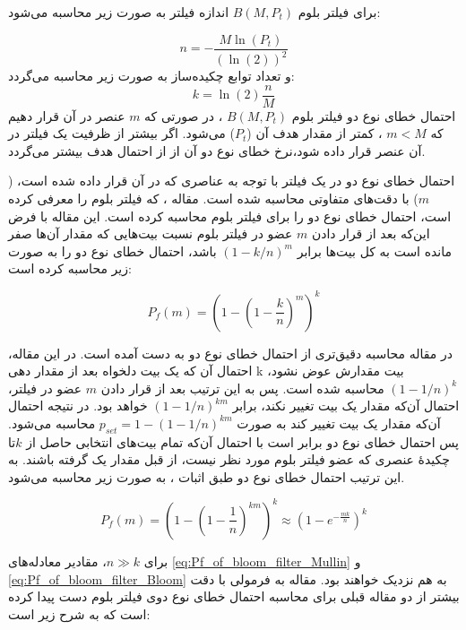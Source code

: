 برای فیلتر بلوم
$B(M, P_t)$
اندازه فیلتر به صورت زیر محاسبه می‌شود\cite{Gervais2014}:

\begin{equation}
n=-\frac{M\ln(P_t)}{\left(\ln(2)\right)^2} \label{eq:n_of_bloom_filter}
\end{equation}
و تعداد توابع چکیده‌ساز به صورت زیر محاسبه می‌گردد\cite{Gervais2014}:
\begin{equation}
k=\ln(2)\frac{n}{M} \label{eq:k_of_bloom_filter}
\end{equation}
احتمال خطای نوع دو فیلتر بلوم
$B(M, P_t)$
، در صورتی که $m$ عنصر در آن قرار دهیم که
$m<M$
، کمتر از مقدار هدف آن ($P_t$) می‌شود. اگر بیشتر از ظرفیت یک فیلتر در آن عنصر قرار داده شود،‌نرخ خطای نوع دو آن از از احتمال هدف بیشتر می‌گردد.

احتمال خطای نوع دو در یک فیلتر با توجه به عناصری که در آن قرار داده شده است، ($m$) با دقت‌های متفاوتی محاسبه شده است. مقاله \cite{Bloom1970}، که فیلتر بلوم را معرفی کرده است، احتمال خطای نوع دو را برای فیلتر بلوم محاسبه کرده است. این مقاله با فرض این‌که بعد از قرار دادن $m$ عضو در فیلتر بلوم نسبت بیت‌هایی که مقدار آن‌ها صفر مانده است به کل بیت‌ها برابر
$(1-k/n)^m$
باشد، احتمال خطای نوع دو را به صورت زیر محاسبه کرده است:

\begin{equation}
P_f(m) = \left(1-\left(1-\frac{k}{n}\right)^{m}\right)^k \label{eq:Pf_of_bloom_filter_Bloom}
\end{equation}

در مقاله \cite{Mullin1983} محاسبه دقیق‌تری از احتمال خطای نوع دو به دست آمده است. در این مقاله، احتمال آن که یک بیت دلخواه بعد از مقدار دهی k بیت مقدارش عوض نشود،
$(1-1/n)^k$
محاسبه شده است. پس به این ترتیب بعد از قرار دادن $m$ عضو در فیلتر، احتمال آن‌که مقدار یک بیت تغییر نکند، برابر 
$(1-1/n)^{km}$
خواهد بود. در نتیجه احتمال آن‌که مقدار یک بیت تغییر کند به صورت 
$p_{set} = 1-(1-1/n)^{km}$
محاسبه می‌شود. پس احتمال خطای نوع دو برابر است با احتمال آن‌که تمام بیت‌های انتخابی حاصل از $k$تا چکیدهٔ عنصری که عضو فیلتر بلوم مورد نظر نیست،‌ از قبل مقدار یک گرفته باشند. به این ترتیب احتمال خطای نوع دو طبق اثبات \cite{Mullin1983}، به صورت زیر محاسبه می‌شود.

\begin{equation}
P_f(m) = \left(1-\left(1-\frac{1}{n}\right)^{km}\right)^k \approx \left(1-e^{-\frac{mk}{n}}\right)^k
\label{eq:Pf_of_bloom_filter_Mullin}
\end{equation}

برای $n\gg k$، مقادیر معادله‌های  \eqref{eq:Pf_of_bloom_filter_Mullin} و \eqref{eq:Pf_of_bloom_filter_Bloom} به هم نزدیک خواهند بود. مقاله \cite{Christensen2010} به فرمولی با دقت بیشتر از دو مقاله قبلی برای محاسبه احتمال خطای نوع دوی فیلتر بلوم دست پیدا کرده است که به شرح زیر است:

